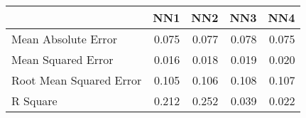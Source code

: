 \begin{tabular}{lrrrr}
\toprule
{} &    NN1 &    NN2 &    NN3 &    NN4 \\
\midrule
Mean Absolute Error     &  0.075 &  0.077 &  0.078 &  0.075 \\
Mean Squared Error      &  0.016 &  0.018 &  0.019 &  0.020 \\
Root Mean Squared Error &  0.105 &  0.106 &  0.108 &  0.107 \\
R Square                &  0.212 &  0.252 &  0.039 &  0.022 \\
\bottomrule
\end{tabular}
